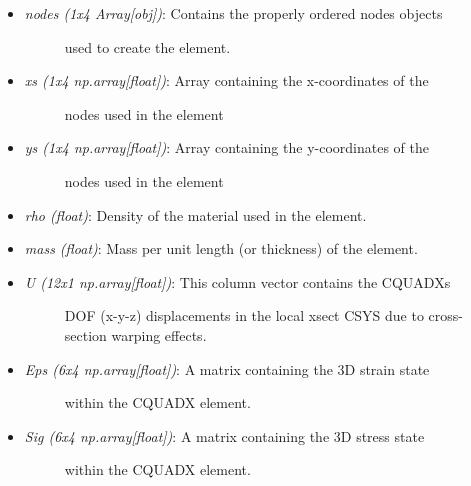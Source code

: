 \documentclass[letterpaper,10pt,english]{sphinxmanual}
\begin{document}
\begin{fulllineitems}
\begin{itemize}
\begin{description}
\end{description}

\item {} \begin{description}
\item[{\emph{nodes (1x4 Array{[}obj{]})}: Contains the properly ordered nodes objects}] \leavevmode
used to create the element.

\end{description}

\item {} \begin{description}
\item[{\emph{xs (1x4 np.array{[}float{]})}: Array containing the x-coordinates of the}] \leavevmode
nodes used in the element

\end{description}

\item {} \begin{description}
\item[{\emph{ys (1x4 np.array{[}float{]})}: Array containing the y-coordinates of the}] \leavevmode
nodes used in the element

\end{description}

\item {} 
\emph{rho (float)}: Density of the material used in the element.

\item {} 
\emph{mass (float)}: Mass per unit length (or thickness) of the element.

\item {} \begin{description}
\item[{\emph{U (12x1 np.array{[}float{]})}: This column vector contains the CQUADXs}]  DOF (x-y-z) displacements in the local xsect CSYS due to cross-
section warping effects.

\end{description}

\item {} \begin{description}
\item[{\emph{Eps (6x4 np.array{[}float{]})}: A matrix containing the 3D strain state}] \leavevmode
within the CQUADX element.

\end{description}

\item {} \begin{description}
\item[{\emph{Sig (6x4 np.array{[}float{]})}: A matrix containing the 3D stress state}] \leavevmode
within the CQUADX element.


\end{description}
\end{itemize}
\end{fulllineitems}
\end{document}
